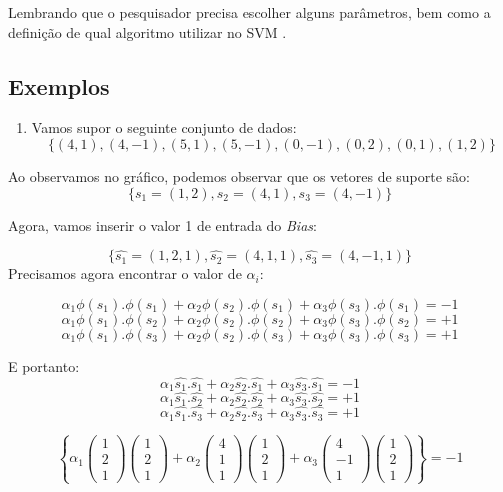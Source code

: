 \documentclass[
]{book}
\providecommand{\tightlist}{%
  \setlength{\itemsep}{0pt}\setlength{\parskip}{0pt}}
\begin{document}
Lembrando que o pesquisador precisa escolher alguns parâmetros, bem como a definição de qual algoritmo utilizar no SVM \citep{lorena2003introduccaoas}.

\hypertarget{exemplosvm}{%
\subsection{Exemplos}\label{exemplosvm}}

\begin{enumerate}
\def\labelenumi{\arabic{enumi}.}
\tightlist
\item
  Vamos supor o seguinte conjunto de dados:
  \[\{ (4,1), (4,-1), (5,1), (5,-1), (0,-1), (0,2), (0,1), (1,2) \}\]
\end{enumerate}

Ao observamos no gráfico, podemos observar que os vetores de suporte são:
\[\{s_1=(1,2),s_2=(4,1),s_3=(4,-1)\}\]

Agora, vamos inserir o valor 1 de entrada do \emph{Bias}:

\[\{\hat{s_1}=(1,2,1),\hat{s_2}=(4,1,1),\hat{s_3}=(4,-1,1)\}\]
Precisamos agora encontrar o valor de \(\alpha_i\):

\[\alpha_1 \phi(s_1).\phi(s_1)+\alpha_2 \phi(s_2).\phi(s_1)+\alpha_3 \phi (s_3).\phi (s_1)=-1\]
\[\alpha_1 \phi(s_1).\phi(s_2)+\alpha_2 \phi(s_2).\phi(s_2)+\alpha_3 \phi (s_3).\phi (s_2)=+1\]
\[\alpha_1 \phi(s_1).\phi(s_3)+\alpha_2 \phi(s_2).\phi(s_3)+\alpha_3 \phi (s_3).\phi (s_3)=+1\]

E portanto:
\[\alpha_1 \hat{s_1}.\hat{s_1}+\alpha_2 \hat{s_2}.\hat{s_1}+\alpha_3 \hat{s_3}.\hat{s_1}=-1\]
\[\alpha_1 \hat{s_1}.\hat{s_2}+\alpha_2 \hat{s_2}.\hat{s_2}+\alpha_3 \hat{s_3}.\hat{s_2}=+1\]
\[\alpha_1 \hat{s_1}.\hat{s_3}+\alpha_2 \hat{s_2}.\hat{s_3}+\alpha_3 \hat{s_3}.\hat{s_3}=+1\]

\[\left\{
\alpha_1
\begin{pmatrix}
1\\2\\1
\end{pmatrix}
\begin{pmatrix}
1\\2\\1
\end{pmatrix} +
\alpha_2
\begin{pmatrix}
4\\1\\1
\end{pmatrix}
\begin{pmatrix}
1\\2\\1
\end{pmatrix}+
\alpha_3
\begin{pmatrix}
4\\-1\\1
\end{pmatrix}
\begin{pmatrix}
1\\2\\1
\end{pmatrix}
\right\}=-1\]
\end{document}
